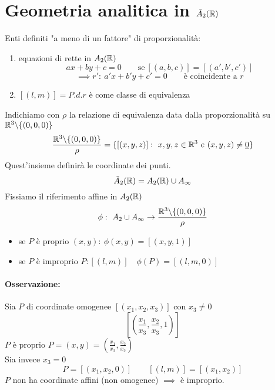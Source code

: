 \documentclass{report}
\begin{document}
\section{Geometria analitica in \(\tilde{A}_{2}(\RR) \)}
Enti definiti "a meno di un fattore" di proporzionalità:
\begin{enumerate}
    \item equazioni di rette in \(A_{2}(\RR) \) \[
            ax + by + c = 0 \qquad \text{se} \ [(a,b,c)] = [(a',b', c')]
    \] \[
    \implies r' : \ a'x + b'y + c' = 0 \qquad \text{è coincidente a } r
    \] 
\item \([(l,m)] = P.d.r\) è come classe di equivalenza 
\end{enumerate}
Indichiamo con \(\rho \) la relazione di equivalenza data dalla proporzionalità su \(\RR^{3}\backslash \{(0,0,0)\} \) 
\[
    \frac{\RR^{3}\backslash \{(0,0,0)\}}{\rho} = \{[(x,y,z)] : \ x,y,z \in \RR^{3} \ e \ (x,y,z) \neq \ul{0} \} 
\] 
Quest'insieme definirà le coordinate dei punti.
\[
\tilde{A}_{2}(\RR) = A_{2}(\RR) \cup A_{\infty}
\] Fissiamo il riferimento affine in \(A_{2}(\RR) \) \[
\phi: \ A_2 \cup A_{\infty} \to \frac{\RR^{3}\backslash \{(0,0,0)\}}{\rho} 
\] 
\begin{itemize}
    \item se \(P\) è proprio \((x,y) : \ \phi(x, y) = [(x,y,1)]\)
    \item se \(P\) è improprio \(P: [(l,m)] \quad \phi (P) = [(l,m,0)]\)
\end{itemize}


\paragraph{Osservazione:} Sia \(P\) di coordinate omogenee \([(x_1,x_2,x_3)]\) con \(x_3\neq 0\) \[
    \left[ \left( \frac{x_1}{x_3}, \frac{x_2}{x_3}, 1 \right)  \right] 
\] \(P\) è proprio \(P = (x,y) = (\frac{x_1}{x_3}, \frac{x_2}{x_3})\) \\
Sia invece \(x_3= 0\) 
\[
    P = [(x_1,x_2, 0 )] \qquad [(l,m)] = [(x_1,x_2)]
\] \(P\) non ha coordinate affini (non omogenee) \(\implies \) è improprio.
\end{document}
